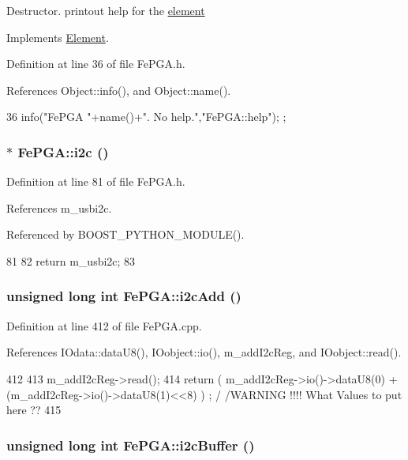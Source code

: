Destructor. printout help for the \hyperlink{namespaceelement}{element} 

Implements \hyperlink{classElement_a32c0de27acb08e17251cef88c3e9303a}{Element}.

Definition at line 36 of file FePGA.h.

References Object::info(), and Object::name().


\begin{DoxyCode}
36 { info("FePGA "+name()+". No help.","FePGA::help"); };
\end{DoxyCode}
\hypertarget{classFePGA_a1553db5010cce9e3495aa3060baf0b3c}{
\subsubsection[{i2c}]{$\ast$ FePGA::i2c ()}}
\label{classFePGA_a1553db5010cce9e3495aa3060baf0b3c}


Definition at line 81 of file FePGA.h.

References m\_\-usbi2c.

Referenced by BOOST\_\-PYTHON\_\-MODULE().


\begin{DoxyCode}
81                     {
82     return m_usbi2c;
83   }
\end{DoxyCode}
\hypertarget{classFePGA_a26b690b730b5f668ab28fb8deab8326b}{
\subsubsection[{i2cAdd}]{\setlength{\rightskip}{0pt plus 5cm}unsigned long int FePGA::i2cAdd ()}}
\label{classFePGA_a26b690b730b5f668ab28fb8deab8326b}


Definition at line 412 of file FePGA.cpp.

References IOdata::dataU8(), IOobject::io(), m\_\-addI2cReg, and IOobject::read().


\begin{DoxyCode}
412                                {
413   m_addI2cReg->read();
414   return ( m_addI2cReg->io()->dataU8(0) + (m_addI2cReg->io()->dataU8(1)<<8) ) ; /
      /WARNING !!!! What Values to put here ??
415 }
\end{DoxyCode}
\hypertarget{classFePGA_a5577463c8478cb6d54fc3c75b26cd819}{
\subsubsection[{i2cBuffer}]{\setlength{\rightskip}{0pt plus 5cm}unsigned long int FePGA::i2cBuffer ()}}
\label{classFePGA_a5577463c8478cb6d54fc3c75b26cd819}


